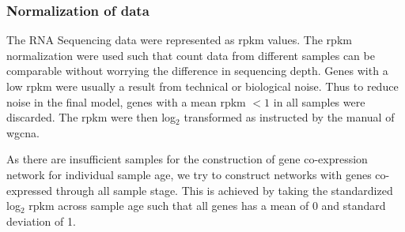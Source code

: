 \subsubsection{Normalization of data}
The RNA Sequencing data were represented as \gls{rpkm} values.
The \gls{rpkm} normalization were used such that count data from different samples can be comparable without worrying the difference in sequencing depth. 
Genes with a low \gls{rpkm} were usually a result from technical or biological noise\citep{Hart2013}.
Thus to reduce noise in the final model, genes with a mean \gls{rpkm} $< 1$ in all samples were discarded. 
The \gls{rpkm} were then log$_2$ transformed as instructed by the manual of \gls{wgcna}\citep{Langfelder2008}.

As there are insufficient samples for the construction of gene co-expression network for individual sample age, we try to construct networks with genes co-expressed through all sample stage. 
This is achieved by taking the standardized log$_2$ \gls{rpkm} across sample age such that all genes has a mean of 0 and standard deviation of 1.

